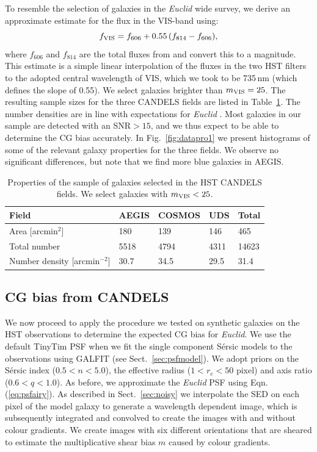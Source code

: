 \documentclass[useAMS,usenatbib]{mnras}
\newcommand{\be}{\begin{equation}}
\newcommand{\ee}{\end{equation}}
\begin{document}
To resemble the selection of galaxies in the {\it Euclid}  wide survey, we derive an approximate estimate for the flux in the VIS-band using:
%
\be
f_{\rm VIS}=f_{606}+ 0.55\,(f_{814}-f_{606}),
\ee
%
where $f_{606}$ and $f_{814}$ are the total fluxes from \cite{skelton14} and convert this to a magnitude. This estimate is a simple linear interpolation of the fluxes in the two HST filters to the adopted central wavelength of VIS, which we took to be 735\,nm (which defines the slope of 0.55). We select galaxies brighter than $m_{\rm VIS}=25$.  The resulting sample sizes for the  three CANDELS fields are listed in Table~\ref{table:mag}. The number densities are in line with expectations for {\it Euclid} \citep{Laureijs11}.
Most galaxies in our sample are detected with an SNR$>15$, and we thus  expect to be able to determine the CG bias accurately.  In Fig.~\ref{fig:datapro1} we present histograms of some of the relevant galaxy properties for the three fields. We observe no significant differences, but note that we find more blue galaxies in AEGIS.

\begin{center}
\begin{table}
  \begin{tabular}{lllll}
    \hline
    Field               &AEGIS   &COSMOS   &UDS  &Total\\
    \hline
    Area [arcmin$^2$]  	 		&180      & 139     &146    & 465\\
    Total number                 		 	& 5518    & 4794  & 4311  &14623\\
    Number density [arcmin$^{-2}$]     & 30.7    & 34.5   & 29.5   &31.4\\
    \hline
  \end{tabular}
  \caption{\label{table:mag}
Properties of the sample of galaxies selected in the HST CANDELS fields. We
select galaxies with $m_{\rm VIS}<25$.}
\end{table}
\end{center}
%

\subsection{CG bias from CANDELS}

We now proceed to apply the procedure we tested on synthetic galaxies on the HST observations to determine the expected CG bias for {\it Euclid}. We use the default {\sc TinyTim} PSF when we fit the single component S{\'e}rsic models to the observations using {\sc GALFIT} (see Sect.~\ref{sec:psfmodel}).
We adopt priors on the S{\'e}rsic index ($0.5<n<5.0$), the effective radius ($1<r_e<50$ pixel) and axis ratio ($0.6<q<1.0$). As before, we approximate the {\it Euclid} PSF using Eqn.\,(\ref{eq:psfairy}).  As described in Sect.~\ref{sec:noisy} we interpolate the SED on each pixel of the model galaxy to generate a wavelength dependent image, which is subsequently integrated and convolved to  create the images with and without colour gradients. We create images with six different orientations that are sheared to estimate the multiplicative shear bias $m$ caused by colour gradients.
\end{document}
